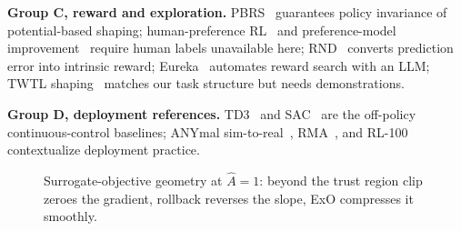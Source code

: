 \documentclass[conference]{IEEEtran}
\begin{document}
\textbf{Group C, reward and exploration.} PBRS~\cite{pbrs} guarantees
policy invariance of potential-based shaping; human-preference
RL~\cite{pref} and preference-model improvement~\cite{imprm} require human
labels unavailable here; RND~\cite{rnd} converts prediction error into
intrinsic reward; Eureka~\cite{eureka} automates reward search with an LLM;
TWTL shaping~\cite{twtl} matches our task structure but needs demonstrations.

\textbf{Group D, deployment references.} TD3~\cite{td3} and SAC~\cite{sac}
are the off-policy continuous-control baselines; ANYmal sim-to-real~\cite{anymal},
RMA~\cite{rma}, and RL-100~\cite{rl100} contextualize deployment practice.

\begin{figure}[!t]
\centering
{}
\caption{Surrogate-objective geometry at $\hat A{=}1$: beyond the trust region
clip zeroes the gradient, rollback reverses the slope, ExO compresses it smoothly.}
\label{fig:geometry}
\end{figure}
\end{document}
